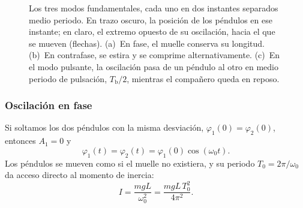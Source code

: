 \documentclass[a4paper,11pt]{amsart}
\numberwithin{equation}{section}
\newcommand{\Tb}{T_{\mathrm{b}}}              %
\newcommand{\wz}{\omega_0}                    %
\newcommand{\wu}{\omega_1}                    %
\theoremstyle{cienplano}
\theoremstyle{ciendef}
\theoremstyle{cienobs}
\begin{document}
\begin{figure}[ht]
\centering
{}
\caption{Los tres modos fundamentales, cada uno en dos instantes separados
medio periodo. En trazo oscuro, la posición de los péndulos en ese instante;
en claro, el extremo opuesto de su oscilación, hacia el que se mueven
(flechas). (a)~En fase, el muelle conserva su longitud. (b)~En contrafase, se
estira y se comprime alternativamente. (c)~En el modo pulsante, la oscilación
pasa de un péndulo al otro en medio periodo de pulsación, $\Tb/2$, mientras
el compañero queda en reposo.}
\label{fig:regimenes}
\end{figure}

\subsubsection*{Oscilación en fase}
Si soltamos los dos péndulos con la misma desviación, $\varphi_1(0)=\varphi_2(0)$,
entonces $A_1=0$ y
\begin{equation}\label{eq:fase}
  \varphi_1(t)=\varphi_2(t)=\varphi_1(0)\cos(\wz t).
\end{equation}
Los péndulos se mueven como si el muelle no existiera, y su periodo
$T_0=2\pi/\wz$ da acceso directo al momento de inercia:
\begin{equation}\label{eq:inercia}
  I=\frac{mgL}{\wz^{2}}=\frac{mgL\,T_0^{2}}{4\pi^{2}} .
\end{equation}
\end{document}
